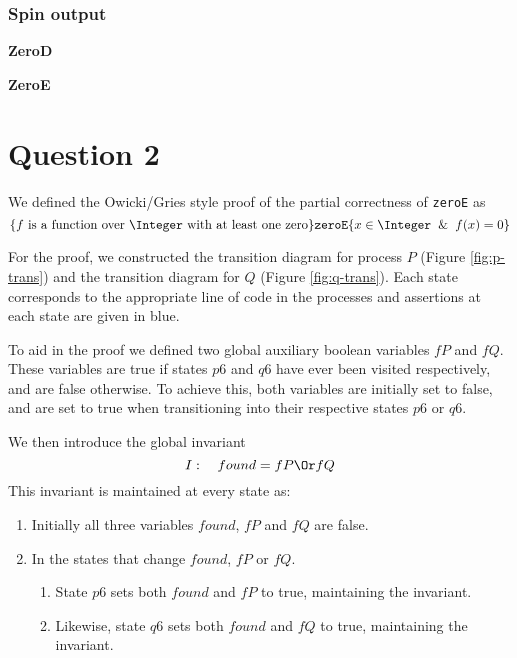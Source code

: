 \documentclass[12pt,a4paper]{scrartcl}
\begin{document}
\subsubsection{Spin output}

\textbf{ZeroD}

\textbf{ZeroE}

\section{Question 2}

We defined the Owicki/Gries style proof of the partial correctness of \texttt{zeroE} as
\begin{equation}
    \{ \textrm{$f$ is a function over $\Integer$ with at least one zero} \}
    \texttt{zeroE}
    \{ x \in \Integer \And f(x)=0 \}
\label{eq:og-proof}
\end{equation}

For the proof, we constructed the transition diagram for process $P$ (Figure \ref{fig:p-trans}) and the transition diagram for $Q$ (Figure \ref{fig:q-trans}).
Each state corresponds to the appropriate line of code in the processes and assertions at each state are given in blue.

To aid in the proof we defined two global auxiliary boolean variables $fP$ and $fQ$.
These variables are true if states $p6$ and $q6$ have ever been visited respectively, and are false otherwise.
To achieve this, both variables are initially set to false, and are set to true when transitioning into their respective states $p6$ or $q6$.

We then introduce the global invariant
\begin{equation}
    I: \quad found = fP \Or fQ
\label{eq:og-invariant}
\end{equation}
This invariant is maintained at every state as:
\begin{enumerate}
    \item Initially all three variables $found$, $fP$ and $fQ$ are false.
    \item In the states that change $found$, $fP$ or $fQ$.
    \begin{enumerate}
        \item State $p6$ sets both $found$ and $fP$ to true, maintaining the invariant.
        \item Likewise, state $q6$ sets both $found$ and $fQ$ to true, maintaining the invariant.
    \end{enumerate}
\end{enumerate}
\end{document}
